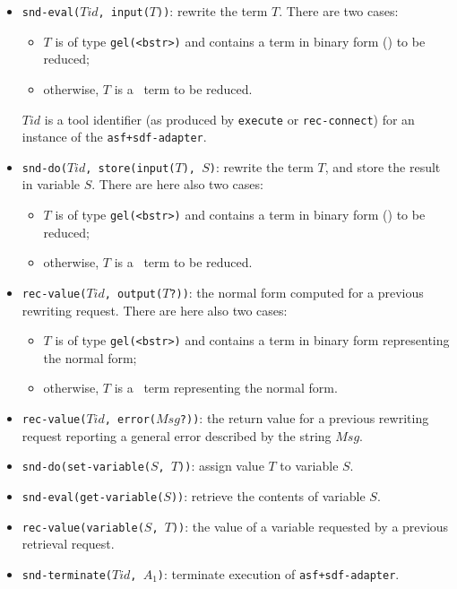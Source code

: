 \begin{itemize}
  \item {\tt snd-eval($Tid$, input($T$))}: rewrite the term $T$.
        There are two cases:
  \begin{itemize}
    \item $T$ is of type {\tt gel(<bstr>)} and contains a term in binary form (\GEL)
          to be reduced;
    \item otherwise, $T$ is a \TB\ term to be reduced.
  \end{itemize}
  $Tid$ is a tool identifier 
  (as produced by {\tt execute} or {\tt rec-connect}) for an instance of 
  the {\tt asf+sdf-adapter}.

  \item {\tt snd-do($Tid$, store(input($T$), $S$)}: rewrite the term $T$, 
        and store the result in variable $S$.
        There are here also two cases:
  \begin{itemize}
    \item $T$ is of type {\tt gel(<bstr>)} and contains a term in binary form (\GEL)
          to be reduced;
    \item otherwise, $T$ is a \TB\ term to be reduced.
  \end{itemize}

  \item {\tt rec-value($Tid$, output($T$?))}: the normal form computed for 
        a previous rewriting request. There are here also two cases:
  \begin{itemize}
    \item $T$ is of type {\tt gel(<bstr>)} and contains a term in binary form
          representing the normal form;
    \item otherwise, $T$ is a \TB\ term representing the normal form.
  \end{itemize}

  \item {\tt rec-value($Tid$, error($Msg$?))}: the return value for a previous
        rewriting request reporting a general error described by the string 
        $Msg$.

  \item {\tt snd-do(set-variable($S$, $T$))}: assign value $T$ to variable
        $S$.

  \item {\tt snd-eval(get-variable($S$))}: retrieve the contents of
        variable $S$.

  \item {\tt rec-value(variable($S$, $T$))}: the value of a variable
        requested by a previous retrieval request.

  \item {\tt snd-terminate($Tid$, $A_1$)}: terminate execution of {\tt asf+sdf-adapter}.
\end{itemize}


